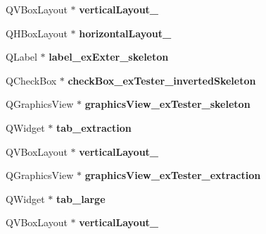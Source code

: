 \begin{DoxyCompactItemize}
\item 
\mbox{\label{class_ui___main_window_af7ec2b6bd15adc9746c431c2a1f654a1}} 
Q\+V\+Box\+Layout $\ast$ {\bfseries vertical\+Layout\+\_}
\item 
\mbox{\label{class_ui___main_window_aa545822a0cc5d4982abca3b10f316b73}} 
Q\+H\+Box\+Layout $\ast$ {\bfseries horizontal\+Layout\+\_}
\item 
\mbox{\label{class_ui___main_window_a33c5b97bd7f0749017793967de9643fd}} 
Q\+Label $\ast$ {\bfseries label\+\_\+ex\+Exter\+\_\+skeleton}
\item 
\mbox{\label{class_ui___main_window_aca08ae4186f0ccda618d881a210eb619}} 
Q\+Check\+Box $\ast$ {\bfseries check\+Box\+\_\+ex\+Tester\+\_\+inverted\+Skeleton}
\item 
\mbox{\label{class_ui___main_window_a0f0ec225975aa99e59a94ddb2a1dc162}} 
Q\+Graphics\+View $\ast$ {\bfseries graphics\+View\+\_\+ex\+Tester\+\_\+skeleton}
\item 
\mbox{\label{class_ui___main_window_a4e4fccbfa47e3d900c69ee49bd074dae}} 
Q\+Widget $\ast$ {\bfseries tab\+\_\+extraction}
\item 
\mbox{\label{class_ui___main_window_af6ef9c52b8692637bdb1e4f46463cc5d}} 
Q\+V\+Box\+Layout $\ast$ {\bfseries vertical\+Layout\+\_}
\item 
\mbox{\label{class_ui___main_window_abd3861b476e12150b1a763c9b97e89d7}} 
Q\+Graphics\+View $\ast$ {\bfseries graphics\+View\+\_\+ex\+Tester\+\_\+extraction}
\item 
\mbox{\label{class_ui___main_window_a58e2076bbc5ffe7e5ce78049c2b5542a}} 
Q\+Widget $\ast$ {\bfseries tab\+\_\+large}
\item 
\mbox{\label{class_ui___main_window_afb101c8cdc0216f724d6c4f1c48e3454}} 
Q\+V\+Box\+Layout $\ast$ {\bfseries vertical\+Layout\+\_}
\item 

\end{DoxyCompactItemize}
